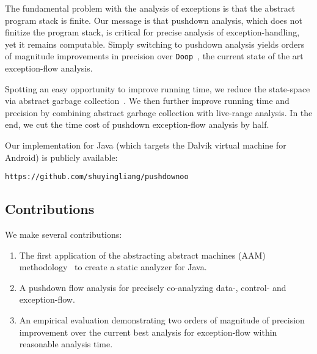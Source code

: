 The fundamental problem with the analysis of exceptions is that the abstract
program stack is finite.
Our message is that pushdown analysis, which does not finitize the program
stack, is critical for precise analysis of exception-handling, yet it remains
computable.
Simply switching to pushdown analysis yields orders of magnitude improvements
in precision over \texttt{Doop}~\cite{mattmight:Bravenboer:2009:Exceptions},
the current state of the art exception-flow analysis.


Spotting an easy opportunity to improve running time, 
we reduce the state-space via abstract garbage collection~\cite{mattmight:Might:2006:GammaCFA}.
We then further improve running time and precision by
combining abstract garbage collection with live-range analysis.
In the end, we cut the time cost of pushdown exception-flow analysis by half.


Our implementation for Java (which targets the Dalvik virtual machine for Android)
 is publicly available:
\begin{center}
\verb+https://github.com/shuyingliang/pushdownoo+
\end{center}


 


\subsection{Contributions}

We make several contributions:

\begin{enumerate}

\item The first  application of the abstracting abstract
machines (AAM) methodology~\cite{mattmight:VanHorn:2010:Abstract} to create a
static analyzer for Java.

\item A pushdown flow analysis for precisely co-analyzing data-, control- and
exception-flow.


\item An empirical evaluation demonstrating two orders of magnitude of 
precision improvement over the current best 
analysis for exception-flow within reasonable analysis time.

\end{enumerate}










